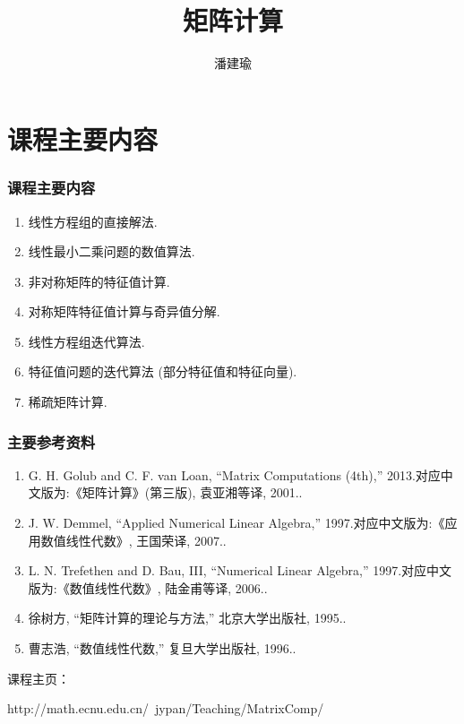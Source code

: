 \documentclass[notheorems,serif]{beamer}
\begin{document}
\title[数值线性代数]{{\small{}~~~~~~~~~~~~~~~~~~~~~~~~~~~~~~~~~~~~~~~~~~~~~~
~~~~~~~~~~~} \\
矩阵计算
}




\author[]{~~潘建瑜~~}

\institute[湘潭大学数学系]

\date[\today]




\frame[plain]{\titlepage}


\section{课程主要内容}

\begin{frame}
\frametitle{课程主要内容}
\begin{enumerate}
	\item { 线性方程组的直接解法}.
	\item { 线性最小二乘问题的数值算法}.
	\item { 非对称矩阵的特征值计算}.
	\item { 对称矩阵特征值计算与奇异值分解}.
	\item { 线性方程组迭代算法}.
	\item { 特征值问题的迭代算法 (部分特征值和特征向量)}. 
	\item { 稀疏矩阵计算}.  
\end{enumerate}
\end{frame}

\begin{frame}
\frametitle{主要参考资料}
\begin{enumerate}
	\item { G. H. Golub and C. F. van Loan, “Matrix Computations (4th),” 2013.对应中文版为:《矩阵计算》(第三版), 袁亚湘等译, 2001.}.
	\item { J. W. Demmel, “Applied Numerical Linear Algebra,” 1997.对应中文版为:《应用数值线性代数》, 王国荣译, 2007.}.
	\item { L. N. Trefethen and D. Bau, III, “Numerical Linear Algebra,” 1997.对应中文版为:《数值线性代数》, 陆金甫等译, 2006.}.
	\item { 徐树方, “矩阵计算的理论与方法,” 北京大学出版社, 1995.}.
	\item { 曹志浩, “数值线性代数,” 复旦大学出版社, 1996.}. 
\end{enumerate}

课程主页：

\qquad  http://math.ecnu.edu.cn/~jypan/Teaching/MatrixComp/

\end{frame}
\end{document}
